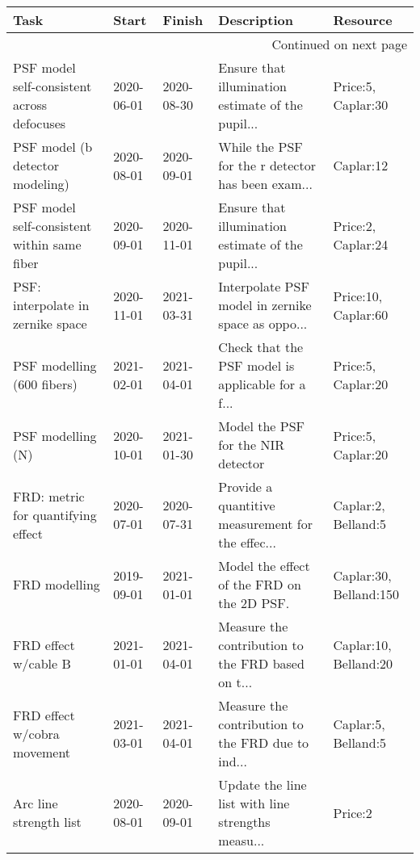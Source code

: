 \begin{longtable}{p{2cm}llp{2cm}l}
\toprule
                                        Task &       Start &      Finish &                                        Description &                Resource \\
\midrule
\endhead
\midrule
\multicolumn{5}{r}{{Continued on next page}} \\
\midrule
\endfoot

\bottomrule
\endlastfoot
  PSF model self-consistent across defocuses &  2020-06-01 &  2020-08-30 &  Ensure that illumination estimate of the pupil... &      Price:5, Caplar:30 \\
             PSF model (b detector modeling) &  2020-08-01 &  2020-09-01 &  While the PSF for the r detector has been exam... &               Caplar:12 \\
 PSF model self-consistent within same fiber &  2020-09-01 &  2020-11-01 &  Ensure that illumination estimate of the pupil... &      Price:2, Caplar:24 \\
           PSF: interpolate in zernike space &  2020-11-01 &  2021-03-31 &  Interpolate PSF model in zernike space as oppo... &     Price:10, Caplar:60 \\
                  PSF modelling (600 fibers) &  2021-02-01 &  2021-04-01 &  Check that the PSF model is applicable for a f... &      Price:5, Caplar:20 \\
                           PSF modelling (N) &  2020-10-01 &  2021-01-30 &                 Model the PSF for the NIR detector &      Price:5, Caplar:20 \\
          FRD: metric for quantifying effect &  2020-07-01 &  2020-07-31 &  Provide a quantitive measurement for the effec... &     Caplar:2, Belland:5 \\
                               FRD modelling &  2019-09-01 &  2021-01-01 &         Model the effect of the FRD on the 2D PSF. &  Caplar:30, Belland:150 \\
                        FRD effect w/cable B &  2021-01-01 &  2021-04-01 &  Measure the contribution to the FRD based on t... &   Caplar:10, Belland:20 \\
                 FRD effect w/cobra movement &  2021-03-01 &  2021-04-01 &  Measure the contribution to the FRD due to ind... &     Caplar:5, Belland:5 \\
                      Arc line strength list &  2020-08-01 &  2020-09-01 &  Update the line list with line strengths measu... &                 Price:2 \\

\end{longtable}
